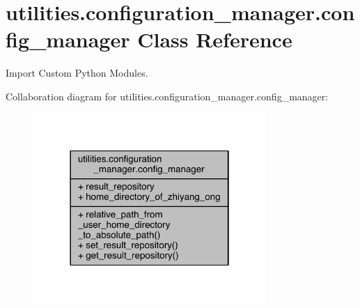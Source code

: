 \hypertarget{classutilities_1_1configuration__manager_1_1config__manager}{}\section{utilities.\+configuration\+\_\+manager.\+config\+\_\+manager Class Reference}
\label{classutilities_1_1configuration__manager_1_1config__manager}


Import Custom Python Modules.  




Collaboration diagram for utilities.\+configuration\+\_\+manager.\+config\+\_\+manager\+:
\nopagebreak
\begin{figure}[H]
\begin{center}
\leavevmode
\includegraphics[width=250pt]{dc/d57/classutilities_1_1configuration__manager_1_1config__manager__coll__graph}
\end{center}
\end{figure}
